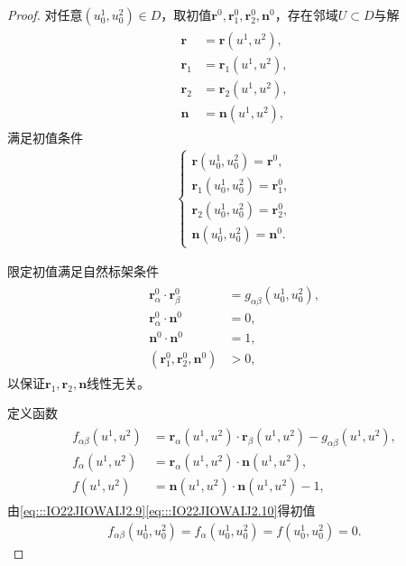 \documentclass[../../main.tex]{subfiles}%
\begin{document}
\begin{proof}
对任意$(u_0^1,u_0^2) \in D$，取初值$\boldsymbol{r}^0,\boldsymbol{r}_1^0,\boldsymbol{r}_2^0,\boldsymbol{n}^0$，存在邻域$U \subset D$与解
\begin{align}
\begin{split}
\boldsymbol{r} &= \boldsymbol{r}(u^1,u^2),\\
\boldsymbol{r}_1 &= \boldsymbol{r}_1(u^1,u^2),\\
\boldsymbol{r}_2 &= \boldsymbol{r}_2(u^1,u^2),\\
\boldsymbol{n} &= \boldsymbol{n}(u^1,u^2),
\end{split}
\label{eq:::IO22JIOWAIJ2.8}
\end{align}
满足初值条件
\begin{align}
\begin{cases}
\boldsymbol{r}(u_0^1,u_0^2) = \boldsymbol{r}^0,\\
\boldsymbol{r}_1(u_0^1,u_0^2) = \boldsymbol{r}_1^0,\\
\boldsymbol{r}_2(u_0^1,u_0^2) = \boldsymbol{r}_2^0,\\
\boldsymbol{n}(u_0^1,u_0^2) = \boldsymbol{n}^0.
\end{cases}
\label{eq:::IO22JIOWAIJ2.9}
\end{align}

限定初值满足自然标架条件
\begin{align}
\begin{split}
\boldsymbol{r}_\alpha^0 \cdot \boldsymbol{r}_\beta^0 &= g_{\alpha\beta}(u_0^1,u_0^2),\\
\boldsymbol{r}_\alpha^0 \cdot \boldsymbol{n}^0 &= 0,\\
\boldsymbol{n}^0 \cdot \boldsymbol{n}^0 &= 1,\\
(\boldsymbol{r}_1^0,\boldsymbol{r}_2^0,\boldsymbol{n}^0) &> 0,
\end{split}
\label{eq:::IO22JIOWAIJ2.10}
\end{align}
以保证$\boldsymbol{r}_1,\boldsymbol{r}_2,\boldsymbol{n}$线性无关。

定义函数
\begin{align}
\begin{split}
f_{\alpha\beta}(u^1,u^2) &= \boldsymbol{r}_\alpha(u^1,u^2) \cdot \boldsymbol{r}_\beta(u^1,u^2) - g_{\alpha\beta}(u^1,u^2),\\
f_\alpha(u^1,u^2) &= \boldsymbol{r}_\alpha(u^1,u^2) \cdot \boldsymbol{n}(u^1,u^2),\\
f(u^1,u^2) &= \boldsymbol{n}(u^1,u^2) \cdot \boldsymbol{n}(u^1,u^2) - 1,
\end{split}
\label{eq:::IO22JIOWAIJ2.11}
\end{align}
由\eqref{eq:::IO22JIOWAIJ2.9}\eqref{eq:::IO22JIOWAIJ2.10}得初值
\begin{align}
f_{\alpha\beta}(u_0^1,u_0^2)=f_\alpha(u_0^1,u_0^2)=f(u_0^1,u_0^2)=0.
\label{eq:::IO22JIOWAIJ2.12}
\end{align}


\end{proof}
\end{document}
